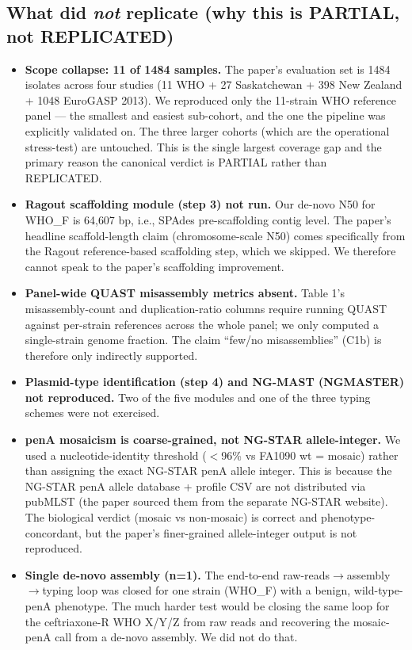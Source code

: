 \documentclass[11pt,letterpaper]{article}
\begin{document}
\subsection*{What did \emph{not} replicate (why this is PARTIAL, not REPLICATED)}
\begin{itemize}[leftmargin=1.5em]
  \item \textbf{Scope collapse: 11 of 1484 samples.} The paper's evaluation set is 1484 isolates across four studies (11 WHO + 27 Saskatchewan + 398 New Zealand + 1048 EuroGASP 2013). We reproduced only the 11-strain WHO reference panel --- the smallest and easiest sub-cohort, and the one the pipeline was explicitly validated on. The three larger cohorts (which are the operational stress-test) are untouched. This is the single largest coverage gap and the primary reason the canonical verdict is PARTIAL rather than REPLICATED.
  \item \textbf{Ragout scaffolding module (step 3) not run.} Our de-novo N50 for WHO\_F is 64{,}607 bp, i.e., SPAdes pre-scaffolding contig level. The paper's headline scaffold-length claim (chromosome-scale N50) comes specifically from the Ragout reference-based scaffolding step, which we skipped. We therefore cannot speak to the paper's scaffolding improvement.
  \item \textbf{Panel-wide QUAST misassembly metrics absent.} Table 1's misassembly-count and duplication-ratio columns require running QUAST against per-strain references across the whole panel; we only computed a single-strain genome fraction. The claim ``few/no misassemblies'' (C1b) is therefore only indirectly supported.
  \item \textbf{Plasmid-type identification (step 4) and NG-MAST (NGMASTER) not reproduced.} Two of the five modules and one of the three typing schemes were not exercised.
  \item \textbf{penA mosaicism is coarse-grained, not NG-STAR allele-integer.} We used a nucleotide-identity threshold ($<$96\% vs FA1090 wt = mosaic) rather than assigning the exact NG-STAR penA allele integer. This is because the NG-STAR penA allele database + profile CSV are not distributed via pubMLST (the paper sourced them from the separate NG-STAR website). The biological verdict (mosaic vs non-mosaic) is correct and phenotype-concordant, but the paper's finer-grained allele-integer output is not reproduced.
  \item \textbf{Single de-novo assembly (n=1).} The end-to-end raw-reads$\rightarrow$assembly$\rightarrow$typing loop was closed for one strain (WHO\_F) with a benign, wild-type-penA phenotype. The much harder test would be closing the same loop for the ceftriaxone-R WHO X/Y/Z from raw reads and recovering the mosaic-penA call from a de-novo assembly. We did not do that.
\end{itemize}
\end{document}
